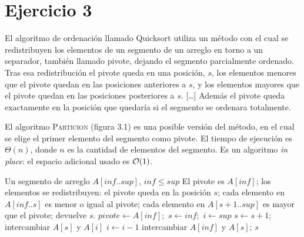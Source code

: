 \section{Ejercicio 3}

\begin{enunciado}
El algoritmo de ordenación llamado Quicksort utiliza un método con el cual se
redistribuyen los elementos de un segmento de un arreglo en torno a un separador, también
llamado pivote, dejando el segmento parcialmente ordenado. Tras esa redistribución el
pivote queda en una posición, $s$, los elementos menores que el pivote quedan en las
posiciones anteriores a $s$, y los elementos mayores que el pivote quedan en las
posiciones posteriores a $s$. [\dots] Además el pivote queda exactamente en la posición que
quedaría si el segmento se ordenara totalmente.

El algoritmo \textsc{Particion} (figura 3.1) es una posible versión del método, en el cual
se elige el primer elemento del segmento como pivote. El tiempo de ejecución es
$\Theta(n)$, donde $n$ es la cantidad de elementos del segmento. Es un algoritmo
\emph{in place}: el espacio adicional usado es $\mathcal{O}(1)$.

\begin{algorithmic}[1]
\Require Un segmento de arreglo $A[\mathit{inf}..\mathit{sup}]$, $\mathit{inf}\le\mathit{sup}$
\Ensure El pivote es $A[\mathit{inf}]$; los elementos se redistribuyen: el pivote queda en
la posición $s$; cada elemento en $A[\mathit{inf}..s]$ es menor o igual al pivote; cada
elemento en $A[s+1..\mathit{sup}]$ es mayor que el pivote; devuelve $s$.
\State $pivote\gets A[\mathit{inf}]$;\ $s\gets\mathit{inf}$;\ $i\gets\mathit{sup}$
    \State $s\gets s+1$; intercambiar $A[s]$ y $A[i]$
  \Else
    \State $i\gets i-1$
  \EndIf
\EndWhile
\State intercambiar $A[\mathit{inf}]$ y $A[s]$; \Return $s$
\end{algorithmic}


\end{enunciado}
